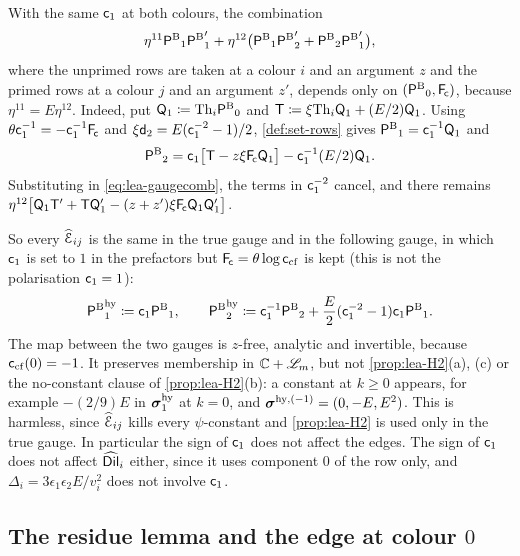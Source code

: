 \begin{rmk}[Gauge]\label{rmk:lea-gauge}
With the same $\mathsf{c}_{1}$ at both colours, the combination
\begin{equation}\label{eq:lea-gaugecomb}
\eta^{11}{\mathsf{P}^{\mathrm{B}}}_1{\mathsf{P}^{\mathrm{B}}}_1'+\eta^{12}\bigl({\mathsf{P}^{\mathrm{B}}}_1{\mathsf{P}^{\mathrm{B}}}_2'+{\mathsf{P}^{\mathrm{B}}}_2{\mathsf{P}^{\mathrm{B}}}_1'\bigr),
\end{equation}
where the unprimed rows are taken at a colour $i$ and an argument $z$ and the primed rows at a colour $j$ and an argument $z'$, depends only on $({\mathsf{P}^{\mathrm{B}}}_0,\mathsf{F}_{\!\mathsf{c}})$, because $\eta^{11}=E\eta^{12}$. Indeed, put $\mathsf{Q}_1\coloneqq\mathrm{Th}_i{\mathsf{P}^{\mathrm{B}}}_0$ and $\mathsf{T}\coloneqq\xi\mathrm{Th}_i\mathsf{Q}_1+(E/2)\mathsf{Q}_1$. Using $\theta\mathsf{c}_{1}^{-1}=-\mathsf{c}_{1}^{-1}\mathsf{F}_{\!\mathsf{c}}$ and $\xi\mathsf{d}_{2}=E(\mathsf{c}_{1}^{-2}-1)/2$, \cref{def:set-rows} gives ${\mathsf{P}^{\mathrm{B}}}_1=\mathsf{c}_{1}^{-1}\mathsf{Q}_1$ and
\[
{\mathsf{P}^{\mathrm{B}}}_2=\mathsf{c}_{1}\bigl[\mathsf{T}-z\xi\mathsf{F}_{\!\mathsf{c}}\mathsf{Q}_1\bigr]-\mathsf{c}_{1}^{-1}(E/2)\mathsf{Q}_1.
\]
Substituting in \cref{eq:lea-gaugecomb}, the terms in $\mathsf{c}_{1}^{-2}$ cancel, and there remains $\eta^{12}\bigl[\mathsf{Q}_1\mathsf{T}'+\mathsf{T}\mathsf{Q}_1'-(z+z')\xi\mathsf{F}_{\!\mathsf{c}}\mathsf{Q}_1\mathsf{Q}_1'\bigr]$.

So every $\widehat{\mathcal{E}}_{ij}$ is the same in the true gauge and in the following gauge, in which $\mathsf{c}_{1}$ is set to $1$ in the prefactors but $\mathsf{F}_{\!\mathsf{c}}=\theta\log\mathsf{c}_{\mathrm{cf}}$ is kept (this is not the polarisation $\mathsf{c}_{1}=1$):
\[
{\mathsf{P}^{\mathrm{B}}}_1^{\mathrm{hy}}\coloneqq\mathsf{c}_{1}{\mathsf{P}^{\mathrm{B}}}_1,\qquad {\mathsf{P}^{\mathrm{B}}}_2^{\mathrm{hy}}\coloneqq\mathsf{c}_{1}^{-1}{\mathsf{P}^{\mathrm{B}}}_2+\frac E2(\mathsf{c}_{1}^{-2}-1)\mathsf{c}_{1}{\mathsf{P}^{\mathrm{B}}}_1.
\]
The map between the two gauges is $z$-free, analytic and invertible, because $\mathsf{c}_{\mathrm{cf}}(0)=-1$. It preserves membership in $\mathbb{C}+\mathscr{L}_m$, but not \cref{prop:lea-H2}(a), (c) or the no-constant clause of \cref{prop:lea-H2}(b): a constant at $k\ge0$ appears, for example $-(2/9)E$ in $\boldsymbol{\sigma}_1^{\mathrm{hy}}$ at $k=0$, and $\boldsymbol{\sigma}^{\mathrm{hy},(-1)}=(0,-E,E^2)$. This is harmless, since $\widehat{\mathcal{E}}_{ij}$ kills every $\psi$-constant and \cref{prop:lea-H2} is used only in the true gauge. In particular the sign of $\mathsf{c}_{1}$ does not affect the edges. The sign of $\mathsf{c}_{1}$ does not affect $\widehat{\mathsf{Dil}}_i$ either, since it uses component $0$ of the row only, and $\Delta_i=3\epsilon_1\epsilon_2E/v_i^2$ does not involve $\mathsf{c}_{1}$.
\end{rmk}

\subsection{The residue lemma and the edge at colour \texorpdfstring{$0$}{0}}

